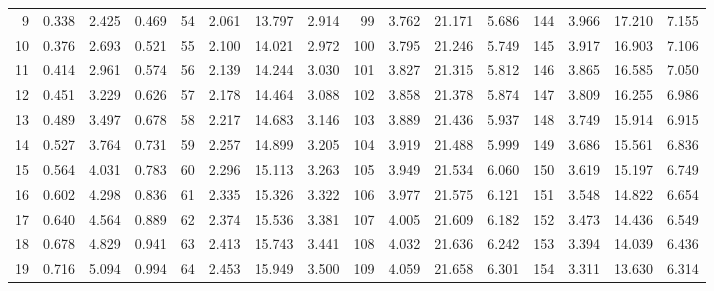 \begin{table}[!h]
{\begin{tabular}{rrrr|rrrr|rrrr|rrrr}
  9 & \tiny{  0.338} &   2.425 & \tiny{  0.469} &  54 & \tiny{  2.061} &  13.797 & \tiny{  2.914} &  99 & \tiny{  3.762} &  21.171 & \tiny{  5.686} & 144 & \tiny{  3.966} &  17.210 & \tiny{  7.155}\\
 10 & \tiny{  0.376} &   2.693 & \tiny{  0.521} &  55 & \tiny{  2.100} &  14.021 & \tiny{  2.972} & 100 & \tiny{  3.795} &  21.246 & \tiny{  5.749} & 145 & \tiny{  3.917} &  16.903 & \tiny{  7.106}\\
 11 & \tiny{  0.414} &   2.961 & \tiny{  0.574} &  56 & \tiny{  2.139} &  14.244 & \tiny{  3.030} & 101 & \tiny{  3.827} &  21.315 & \tiny{  5.812} & 146 & \tiny{  3.865} &  16.585 & \tiny{  7.050}\\
 12 & \tiny{  0.451} &   3.229 & \tiny{  0.626} &  57 & \tiny{  2.178} &  14.464 & \tiny{  3.088} & 102 & \tiny{  3.858} &  21.378 & \tiny{  5.874} & 147 & \tiny{  3.809} &  16.255 & \tiny{  6.986}\\
 13 & \tiny{  0.489} &   3.497 & \tiny{  0.678} &  58 & \tiny{  2.217} &  14.683 & \tiny{  3.146} & 103 & \tiny{  3.889} &  21.436 & \tiny{  5.937} & 148 & \tiny{  3.749} &  15.914 & \tiny{  6.915}\\
 14 & \tiny{  0.527} &   3.764 & \tiny{  0.731} &  59 & \tiny{  2.257} &  14.899 & \tiny{  3.205} & 104 & \tiny{  3.919} &  21.488 & \tiny{  5.999} & 149 & \tiny{  3.686} &  15.561 & \tiny{  6.836}\\
 15 & \tiny{  0.564} &   4.031 & \tiny{  0.783} &  60 & \tiny{  2.296} &  15.113 & \tiny{  3.263} & 105 & \tiny{  3.949} &  21.534 & \tiny{  6.060} & 150 & \tiny{  3.619} &  15.197 & \tiny{  6.749}\\
 16 & \tiny{  0.602} &   4.298 & \tiny{  0.836} &  61 & \tiny{  2.335} &  15.326 & \tiny{  3.322} & 106 & \tiny{  3.977} &  21.575 & \tiny{  6.121} & 151 & \tiny{  3.548} &  14.822 & \tiny{  6.654}\\
 17 & \tiny{  0.640} &   4.564 & \tiny{  0.889} &  62 & \tiny{  2.374} &  15.536 & \tiny{  3.381} & 107 & \tiny{  4.005} &  21.609 & \tiny{  6.182} & 152 & \tiny{  3.473} &  14.436 & \tiny{  6.549}\\
 18 & \tiny{  0.678} &   4.829 & \tiny{  0.941} &  63 & \tiny{  2.413} &  15.743 & \tiny{  3.441} & 108 & \tiny{  4.032} &  21.636 & \tiny{  6.242} & 153 & \tiny{  3.394} &  14.039 & \tiny{  6.436}\\
 19 & \tiny{  0.716} &   5.094 & \tiny{  0.994} &  64 & \tiny{  2.453} &  15.949 & \tiny{  3.500} & 109 & \tiny{  4.059} &  21.658 & \tiny{  6.301} & 154 & \tiny{  3.311} &  13.630 & \tiny{  6.314}\\

\end{tabular}}
\end{table}
